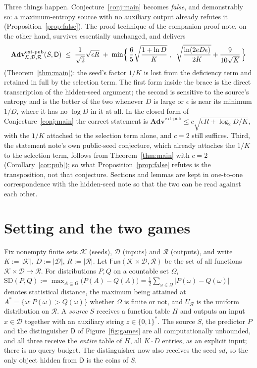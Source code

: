 \documentclass[11pt,a4paper]{article}
\theoremstyle{plain}
\theoremstyle{definition}
\theoremstyle{remark}
\newcommand{\Fun}{\mathsf{Fun}}
\newcommand{\Adv}{\mathbf{Adv}}
\newcommand{\extp}{\mathrm{ext}\text{-}\mathrm{pub}}
\newcommand{\sd}{\mathit{sd}}
\newcommand{\SD}{\mathrm{SD}}
\newcommand{\calK}{\mathcal{K}}
\newcommand{\calD}{\mathcal{D}}
\newcommand{\calR}{\mathcal{R}}
\begin{document}
\noindent
Three things happen. Conjecture~\ref{conj:main} becomes \emph{false}, and demonstrably so: a
maximum-entropy source with no auxiliary output already refutes it
(Proposition~\ref{prop:false}). The proof technique of the companion proof note, on the other
hand, survives essentially unchanged, and delivers
\[
  \Adv^{\extp}_{\calK,\calD,\calR}(S,\mathsf{D})
  \;\le\; \frac{1}{\sqrt{2}}\sqrt{\epsilon R}
  \;+\; \min\Bigl\{\, \frac{6}{5}\sqrt{\frac{1 + \ln D}{K}} \;,\;\;
        \sqrt{\frac{\ln(2eD\epsilon)}{2K}} + \frac{9}{10\sqrt{K}} \,\Bigr\}
\]
(Theorem~\ref{thm:main}): the seed's factor $1/K$ is lost from the deficiency term and retained in
full by the selection term. The first form inside the brace is the direct transcription of the
hidden-seed argument; the second is sensitive to the source's entropy and is the better of the two
whenever $D$ is large or $\epsilon$ is near its minimum $1/D$, where it has no $\log D$ in it at
all. In the closed form of Conjecture~\ref{conj:main} the correct statement is
$\Adv^{\extp} \le c\sqrt{\epsilon R + \log_2 D / K}$, with the $1/K$ attached to the selection term
alone, and $c = 2$ still suffices. Third, the statement note's own public-seed conjecture, which
already attaches the $1/K$ to the selection term, follows from Theorem~\ref{thm:main} with
$c = 2$ (Corollary~\ref{cor:pub}); so what
Proposition~\ref{prop:false} refutes is the transposition, not that conjecture. Sections and lemmas are kept in one-to-one correspondence with
the hidden-seed note so that the two can be read against each other.

\section{Setting and the two games}\label{sec:setting}

Fix nonempty finite sets $\calK$ (seeds), $\calD$ (inputs) and $\calR$ (outputs), and write
$K := |\calK|$, $D := |\calD|$, $R := |\calR|$. Let $\Fun(\calK \times \calD, \calR)$ be the set of
all functions $\calK \times \calD \to \calR$. For distributions $P, Q$ on a countable set $\Omega$,
\(
  \SD(P,Q) := \max_{A \subseteq \Omega}\bigl(P(A) - Q(A)\bigr)
            = \tfrac12 \sum_{\omega \in \Omega} |P(\omega) - Q(\omega)|
\)
denotes statistical distance, the maximum being attained at
$A^{*} = \{\omega : P(\omega) > Q(\omega)\}$ whether $\Omega$ is finite or not, and $U_{\calR}$ is the uniform distribution on $\calR$. A
\emph{source} $S$ receives a function table $H$ and outputs an input $x \in \calD$ together with an
auxiliary string $z \in \{0,1\}^{*}$. The source $S$, the predictor $P$ and the distinguisher $\mathsf{D}$ of
Figure~\ref{fig:games} are all computationally unbounded, and all three receive the \emph{entire}
table of $H$, all $K \cdot D$ entries, as an explicit input; there is no query budget. The
distinguisher now also receives the seed $\sd$, so the only object hidden from $\mathsf{D}$ is the
coins of $S$.
\end{document}
